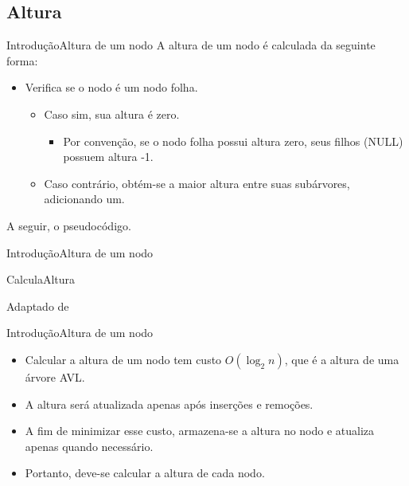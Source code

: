 \documentclass[aspectratio=169]{beamer}
\begin{document}
\subsection{Altura}

\begin{frame}{Introdução}{Altura de um nodo}
A altura de um nodo é calculada da seguinte forma:
 \begin{itemize}
 \item Verifica se o nodo é um nodo folha. 
 \begin{itemize}
 \item Caso sim, sua altura é zero.
 \begin{itemize}
 \item Por convenção, se o nodo folha possui altura zero, seus filhos (NULL) possuem altura -1.
 \end{itemize}
 \item Caso contrário, obtém-se a maior altura entre suas subárvores, adicionando um.
 \end{itemize} 
 \end{itemize} 
A seguir, o pseudocódigo. 
\end{frame}


\begin{frame}{Introdução}{Altura de um nodo}
\begin{algorithm}[H]
\caption{CalculaAltura} 
\label{CalculaAltura}
\end{algorithm}
\tiny{Adaptado de \cite{Backes2016}}    
\end{frame}


\begin{frame}{Introdução}{Altura de um nodo}
\begin{itemize}
 \item Calcular a altura de um nodo tem custo $O(\log_2n)$, que é a altura de uma árvore AVL.
 \item A altura será atualizada apenas após inserções e remoções.
 \item A fim de minimizar esse custo, armazena-se a altura no nodo e atualiza apenas quando necessário.
 \item Portanto, deve-se calcular a altura de cada nodo.
\end{itemize}
\end{frame}
\end{document}
